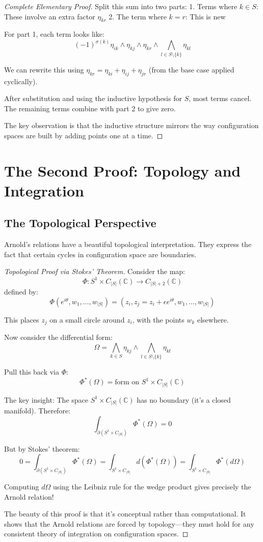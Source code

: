 \begin{proof}[Complete Elementary Proof]
Split this sum into two parts:
1. Terms where $k \in S$: These involve an extra factor $\eta_{kr}$
2. The term where $k = r$: This is new

For part 1, each term looks like:
$$(-1)^{\sigma(k)} \eta_{ik} \wedge \eta_{kj} \wedge \eta_{kr} \wedge \bigwedge_{l \in S\setminus\{k\}} \eta_{kl}$$

We can rewrite this using $\eta_{kr} = \eta_{ki} + \eta_{ij} + \eta_{jr}$ (from the base case applied cyclically). 

After substitution and using the inductive hypothesis for $S$, most terms cancel. The remaining terms combine with part 2 to give zero.

The key observation is that the inductive structure mirrors the way configuration spaces are built by adding points one at a time.
\end{proof}

\section{The Second Proof: Topology and Integration}

\subsection{The Topological Perspective}

Arnold's relations have a beautiful topological interpretation. They express the fact that certain cycles in configuration space are boundaries.

\begin{proof}[Topological Proof via Stokes' Theorem]

Consider the map:
$$\Phi: S^1 \times C_{|S|}(\mathbb{C}) \to C_{|S|+2}(\mathbb{C})$$
defined by:
$$\Phi(e^{i\theta}, w_1, \ldots, w_{|S|}) = (z_i, z_j = z_i + \epsilon e^{i\theta}, w_1, \ldots, w_{|S|})$$

This places $z_j$ on a small circle around $z_i$, with the points $w_k$ elsewhere.

Now consider the differential form:
$$\Omega = \bigwedge_{k \in S} \eta_{kj} \wedge \bigwedge_{l \in S\setminus\{k\}} \eta_{kl}$$

Pull this back via $\Phi$:
$$\Phi^*(\Omega) = \text{form on } S^1 \times C_{|S|}(\mathbb{C})$$

The key insight: The space $S^1 \times C_{|S|}(\mathbb{C})$ has no boundary (it's a closed manifold). Therefore:
$$\int_{\partial(S^1 \times C_{|S|})} \Phi^*(\Omega) = 0$$

But by Stokes' theorem:
$$0 = \int_{\partial(S^1 \times C_{|S|})} \Phi^*(\Omega) = \int_{S^1 \times C_{|S|}} d(\Phi^*(\Omega)) = \int_{S^1 \times C_{|S|}} \Phi^*(d\Omega)$$

Computing $d\Omega$ using the Leibniz rule for the wedge product gives precisely the Arnold relation!

The beauty of this proof is that it's conceptual rather than computational. It shows that the Arnold relations are forced by topology—they must hold for any consistent theory of integration on configuration spaces.
\end{proof}

